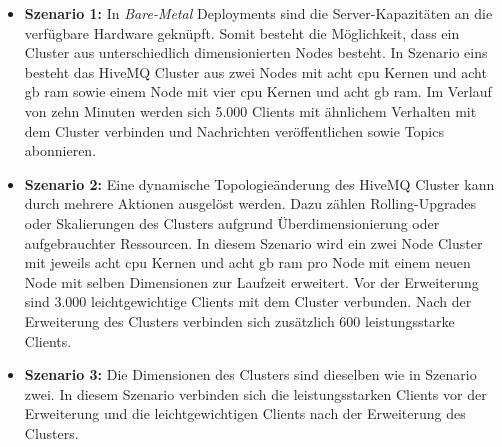 \begin{itemize}
  \item \textbf{Szenario 1:} In \textit{Bare-Metal} Deployments sind die Server-Kapazitäten an die verfügbare Hardware geknüpft. Somit besteht die Möglichkeit, dass ein Cluster aus unterschiedlich dimensionierten Nodes besteht. In Szenario eins besteht das HiveMQ Cluster aus zwei Nodes mit acht \ac{cpu} Kernen und acht \ac{gb} \ac{ram} sowie einem Node mit vier \ac{cpu} Kernen und acht \ac{gb} \ac{ram}. Im Verlauf von zehn Minuten werden sich 5.000 Clients mit ähnlichem Verhalten mit dem Cluster verbinden und Nachrichten veröffentlichen sowie Topics abonnieren.
  \item \textbf{Szenario 2:} Eine dynamische Topologieänderung des HiveMQ Cluster kann durch mehrere Aktionen ausgelöst werden. Dazu zählen Rolling-Upgrades oder Skalierungen des Clusters aufgrund Überdimensionierung oder aufgebrauchter Ressourcen. In diesem Szenario wird ein zwei Node Cluster mit jeweils acht \ac{cpu} Kernen und acht \ac{gb} \ac{ram} pro Node mit einem neuen Node mit selben Dimensionen zur Laufzeit erweitert. Vor der Erweiterung sind 3.000 leichtgewichtige Clients mit dem Cluster verbunden. Nach der Erweiterung des Clusters verbinden sich zusätzlich 600 leistungsstarke Clients.
  \item \textbf{Szenario 3:} Die Dimensionen des Clusters sind dieselben wie in Szenario zwei. In diesem Szenario verbinden sich die leistungsstarken Clients vor der Erweiterung und die leichtgewichtigen Clients nach der Erweiterung des Clusters.
\end{itemize}


